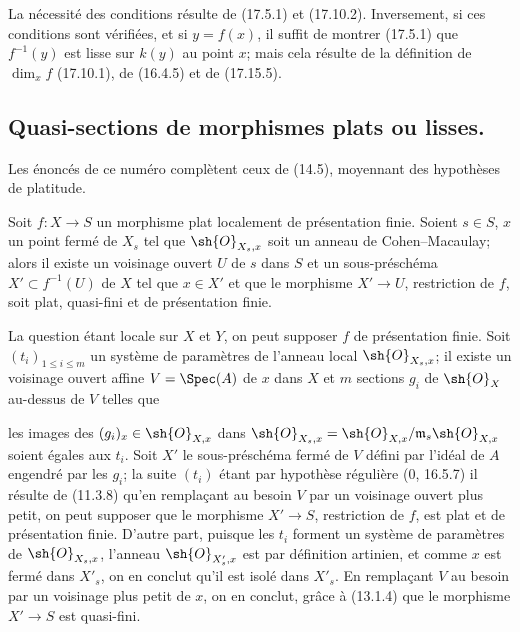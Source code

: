 La nécessité des conditions résulte de (17.5.1) et (17.10.2). Inversement, si ces conditions sont vérifiées, et si $y=f(x)$, il suffit de montrer (17.5.1) que $f^{-1}(y)$ est lisse sur $k(y)$ au point $x$; mais cela résulte de la définition de $\dim_x f$ (17.10.1), de (16.4.5) et de (17.15.5).

\subsection{Quasi-sections de morphismes plats ou lisses.}
\label{subsection:IV.17.16}

Les énoncés de ce numéro complètent ceux de (14.5), moyennant des hypothèses de platitude.

\begin{proposition}[17.16.1]
\label{IV.17.16.1}
Soit $f:X\to S$ un morphisme plat localement de présentation finie. Soient $s\in S$, $x$ un point fermé de $X_s$ tel que $\sh{O}_{X_s,x}$ soit un anneau de Cohen--Macaulay; alors il existe un voisinage ouvert $U$ de $s$ dans $S$ et un sous-préschéma $X'\subset f^{-1}(U)$ de $X$ tel que $x\in X'$ et que le morphisme $X'\to U$, restriction de $f$, soit plat, quasi-fini et de présentation finie.
\end{proposition}

La question étant locale sur $X$ et $Y$, on peut supposer $f$ de présentation finie. Soit $(t_i)_{1\leq i\leq m}$ un système de paramètres de l'anneau local $\sh{O}_{X_s,x}$; il existe un voisinage ouvert affine $V=\Spec(A)$ de $x$ dans $X$ et $m$ sections $g_i$ de $\sh{O}_X$ au-dessus de $V$ telles que


les images des $(g_i)_x\in\sh{O}_{X,x}$ dans $\sh{O}_{X_s,x}=\sh{O}_{X,x}/\mathfrak m_s\sh{O}_{X,x}$ soient égales aux $t_i$. Soit $X'$ le sous-préschéma fermé de $V$ défini par l'idéal de $A$ engendré par les $g_i$; la suite $(t_i)$ étant par hypothèse régulière (0, 16.5.7) il résulte de (11.3.8) qu'en remplaçant au besoin $V$ par un voisinage ouvert plus petit, on peut supposer que le morphisme $X'\to S$, restriction de $f$, est plat et de présentation finie. D'autre part, puisque les $t_i$ forment un système de paramètres de $\sh{O}_{X_s,x}$, l'anneau $\sh{O}_{X'_s,x}$ est par définition artinien, et comme $x$ est fermé dans $X'_s$, on en conclut qu'il est isolé dans $X'_s$. En remplaçant $V$ au besoin par un voisinage plus petit de $x$, on en conclut, grâce à (13.1.4) que le morphisme $X'\to S$ est quasi-fini.

